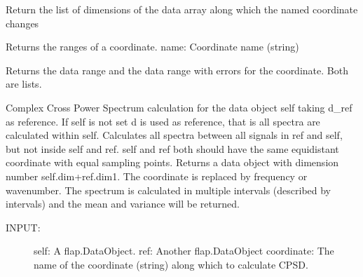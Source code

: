 \documentclass[letterpaper,10pt,english]{sphinxmanual}
\begin{document}
\begin{fulllineitems}
\begin{fulllineitems}
\end{fulllineitems}


\begin{fulllineitems}
\label{\detokenize{data_object:flap.data_object.DataObject.coordinate_nochange_dimensions}}
Return the list of dimensions of the data array along which
the named coordinate changes

\end{fulllineitems}


\begin{fulllineitems}
\label{\detokenize{data_object:flap.data_object.DataObject.coordinate_range}}
Returns the ranges of a coordinate.
name: Coordinate name (string)

Returns the data range and the data range with errors for the coordinate. Both are lists.

\end{fulllineitems}


\begin{fulllineitems}
\label{\detokenize{data_object:flap.data_object.DataObject.cpsd}}
Complex Cross Power Spectrum calculation for the data object self taking d\_ref as reference.
If self is not set d is used as reference, that is all spectra are calculated within self.
Calculates all spectra between all signals in ref and self, but not inside self and ref.
self and ref both should have the same equidistant coordinate with equal sampling points.
Returns a data object with dimension number self.dim+ref.dim\sphinxhyphen{}1. The coordinate is replaced
by frequency or wavenumber.
The spectrum is calculated in multiple intervals (described by intervals)
and the mean and variance will be returned.
\begin{description}
\item[{INPUT:}] \leavevmode
self: A flap.DataObject.
ref: Another flap.DataObject
coordinate: The name of the coordinate (string) along which to calculate CPSD.
\begin{quote}


\end{quote}
\end{description}
\end{fulllineitems}
\end{fulllineitems}
\end{document}
